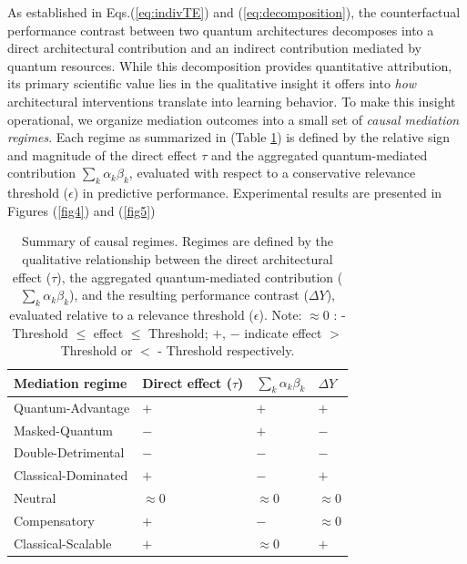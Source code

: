 \documentclass[
    reprint,
    amsmath, amssymb,
    aps,
    floatfix,
    nofootinbib
]{revtex4-1}
\begin{document}
As established in Eqs.(\ref{eq:indivTE}) and (\ref{eq:decomposition}), the counterfactual performance contrast between two quantum architectures decomposes into a direct architectural contribution and an indirect contribution mediated by quantum resources. While this decomposition provides quantitative attribution, its primary scientific value lies in the qualitative insight it offers into \emph{how} architectural interventions translate into learning behavior. To make this insight operational, we organize mediation outcomes into a small set of \emph{causal mediation regimes}. Each regime  as summarized in (Table \ref{tab1}) is defined by the relative sign and magnitude of the direct effect $\tau$ and the aggregated quantum-mediated contribution $\sum_k \alpha_k \beta_k$, evaluated with respect to a conservative relevance threshold ($\epsilon$) in predictive performance. Experimental results are presented in Figures (\ref{fig4}) and (\ref{fig5})
\begin{table}[htbp]
\centering
\caption{Summary of causal regimes. Regimes are defined by the qualitative relationship between the direct architectural effect ($\tau$), the aggregated quantum-mediated contribution ($\sum_k \alpha_k \beta_k$), and the resulting performance contrast ($\Delta Y$), evaluated relative to a relevance threshold ($\epsilon$). Note: $ \approx 0$ :  - Threshold  $\leq $ effect $\leq$ Threshold; $+$, $-$ indicate effect $>$  Threshold or $< $  - Threshold  respectively.} 
\label{tab1}
\begin{tabularx}{\linewidth}{l|l|l|l}
\toprule
\hline
\centering
\textbf{Mediation regime} & Direct effect  ($\tau$) & $\sum_k \alpha_k \beta_k$ & $\Delta Y$ \\
\hline
Quantum-Advantage        & $+$ & $+$ & $+$ \\
Masked-Quantum           & $-$ & $+$ & $-$ \\
Double-Detrimental       & $-$ & $-$ & $-$ \\
Classical-Dominated      & $+$ & $-$ & $+$ \\
Neutral                  & $\approx 0$ & $\approx 0$ & $\approx 0$ \\
Compensatory             & $+$ & $-$ & $\approx 0$ \\
Classical-Scalable       & $+$ & $\approx 0$ & $+$ \\
\bottomrule
\end{tabularx}
\end{table}
\end{document}
